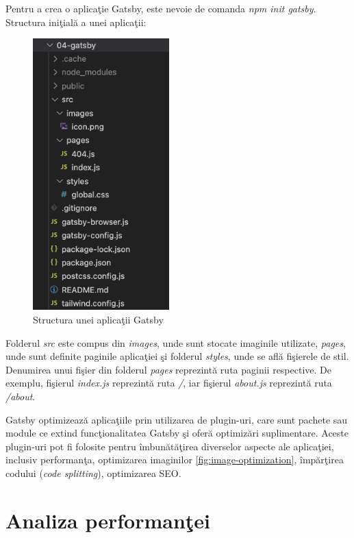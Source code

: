 \documentclass[12pt, a4paper]{report}
\begin{document}
Pentru a crea o aplica\c tie Gatsby, este nevoie de comanda \textit{npm init gatsby}. Structura ini\c tial\u a a unei aplica\c tii:

\begin{figure}[htbp]
	\centering
	\includegraphics[width=0.47\textwidth]{gatsby_file_structure.png}
	\caption{Structura unei aplica\c tii Gatsby}
	\label{fig:gatsby-structure}
\end{figure}

Folderul \textit{src} este compus din \textit{images}, unde sunt stocate imaginile utilizate, \textit{pages}, unde sunt definite paginile aplica\c tiei \c si folderul \textit{styles}, unde se afl\u a fi\c sierele de stil. Denumirea unui fi\c sier din folderul \textit{pages} reprezint\u a ruta paginii respective. De exemplu, fi\c sierul \textit{index.js} reprezint\u a ruta \textit{/}, iar fi\c sierul \textit{about.js} reprezint\u a ruta \textit{/about}.

Gatsby optimizeaz\u a aplica\c tiile prin utilizarea de plugin-uri, care sunt pachete sau module ce extind func\c tionalitatea Gatsby \c si ofer\u a optimiz\u ari suplimentare. Aceste plugin-uri pot fi folosite pentru \^imbun\u at\u a\c tirea diverselor aspecte ale aplica\c tiei, inclusiv performan\c ta, optimizarea imaginilor \ref{fig:image-optimization}, \^imp\u ar\c tirea codului (\textit{code splitting}), optimizarea SEO.

\section{Analiza performan\c tei}
\end{document}
